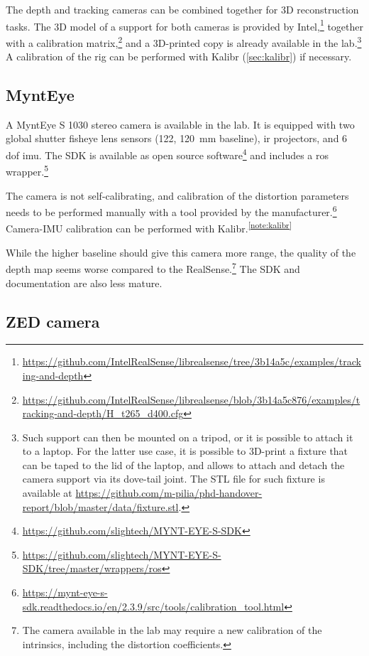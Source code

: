\documentclass[11pt, letterpaper, twoside]{article}
\begin{document}
The depth and tracking cameras can be combined together for 3D reconstruction
tasks. The 3D model of a support for both cameras is provided by
Intel,\footnote{\url{https://github.com/IntelRealSense/librealsense/tree/3b14a5c/examples/tracking-and-depth}}
together with a calibration
matrix,\footnote{\url{https://github.com/IntelRealSense/librealsense/blob/3b14a5c876/examples/tracking-and-depth/H_t265_d400.cfg}}
and a 3D-printed copy is already available in the lab.\footnote{Such support
    can then be mounted on a tripod, or it is possible to attach it to a
    laptop. For the latter use case, it is possible to 3D-print a fixture that
    can be taped to the lid of the laptop, and allows to attach and detach the
    camera support via its dove-tail joint. The STL file for such fixture is
    available at
\url{https://github.com/m-pilia/phd-handover-report/blob/master/data/fixture.stl}.}
A calibration of the rig can be performed with Kalibr (\cref{sec:kalibr}) if
necessary.

\subsection{MyntEye}

A MyntEye S 1030 stereo camera is available in the lab. It is equipped with two
global shutter fisheye lens sensors (122\textdegree{}\textdegree,
120~mm baseline), \gls{ir} projectors, and 6 \gls{dof} \gls{imu}. The SDK is
available as open source
software\footnote{\url{https://github.com/slightech/MYNT-EYE-S-SDK}} and
includes a \gls{ros}
wrapper.\footnote{\url{https://github.com/slightech/MYNT-EYE-S-SDK/tree/master/wrappers/ros}}

The camera is not self-calibrating, and calibration of the distortion
parameters needs to be performed manually with a tool provided by the
manufacturer.\footnote{\url{https://mynt-eye-s-sdk.readthedocs.io/en/2.3.9/src/tools/calibration_tool.html}}
Camera-IMU calibration can be performed with
Kalibr.\textsuperscript{\ref{note:kalibr}}

While the higher baseline should give this camera more range, the quality of
the depth map seems worse compared to the RealSense.\footnote{The camera
available in the lab may require a new calibration of the intrinsics, including
the distortion coefficients.} The SDK and documentation are also less mature.

\subsection{ZED camera}
\end{document}
